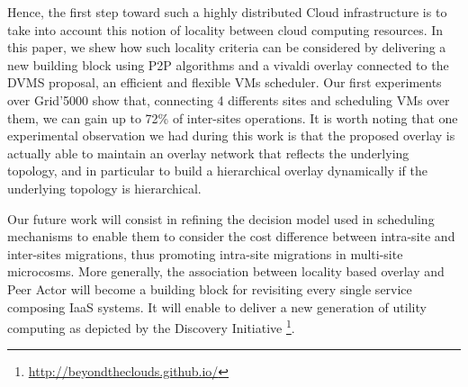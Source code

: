 Hence, the first step toward such a highly distributed Cloud infrastructure is to take
into account this notion of locality between cloud computing resources. In this paper, we
shew how such locality criteria can be considered by delivering a new building block using
P2P algorithms and a vivaldi overlay connected to the DVMS proposal, an efficient and
flexible VMs scheduler. Our first experiments over Grid'5000 show that, connecting 4
differents sites and scheduling VMs over them, we can gain up to 72\% of inter-sites
operations. It is worth noting that one experimental observation we had during this work
is that the proposed overlay is actually able to maintain an overlay network that
reflects the underlying topology, and in particular to build a hierarchical overlay
dynamically if the underlying topology is hierarchical.

Our future work will consist in refining the decision model used in scheduling mechanisms to
enable them to consider the cost difference between intra-site and inter-sites migrations,
thus promoting intra-site migrations in multi-site microcosms. More generally, the
association between locality based overlay and Peer Actor will become a building block for
revisiting every single service composing IaaS systems. It will enable to deliver a new
generation of utility computing as depicted by the Discovery Initiative
\footnote{\url{http://beyondtheclouds.github.io/}}.
